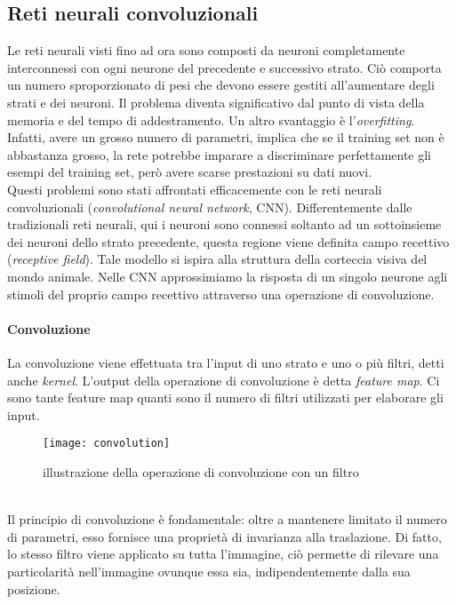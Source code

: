 \subsection{Reti neurali convoluzionali}
Le reti neurali visti fino ad ora sono composti da neuroni completamente interconnessi con ogni neurone del precedente e successivo strato. Ciò comporta un numero sproporzionato di pesi che devono essere gestiti all'aumentare degli strati e dei neuroni. Il problema diventa significativo dal punto di vista della memoria e del tempo di addestramento. Un altro svantaggio è l'\textit{overfitting}. Infatti, avere un grosso numero di parametri, implica che se il training set non è abbastanza grosso, la rete potrebbe imparare a discriminare perfettamente gli esempi del training set, però avere scarse prestazioni su dati nuovi.\\
Questi problemi sono stati affrontati efficacemente con le reti neurali convoluzionali (\textit{convolutional neural network}, CNN). Differentemente dalle tradizionali reti neurali, qui i neuroni sono connessi soltanto ad un sottoinsieme dei neuroni dello strato precedente, questa regione viene definita campo recettivo (\textit{receptive field}). Tale modello si ispira alla struttura della corteccia visiva del mondo animale. Nelle CNN approssimiamo la risposta di un singolo neurone agli stimoli del proprio campo recettivo attraverso una operazione di convoluzione.
\paragraph{Convoluzione} 
La convoluzione viene effettuata tra l'input di uno strato e uno o più filtri, detti anche \textit{kernel}. L'output della operazione di convoluzione è detta \textit{feature map}. Ci sono tante feature map quanti sono il numero di filtri utilizzati per elaborare gli input. 
\begin{figure}[ht]
    \centering
    \texttt{[image: convolution]}
    \caption[Esempio di convoluzione]{illustrazione della operazione di convoluzione con un filtro}
\end{figure}\\
Il principio di convoluzione è fondamentale: oltre a mantenere limitato il numero di parametri, esso fornisce una proprietà di invarianza alla traslazione. Di fatto, lo stesso filtro viene applicato su tutta l'immagine, ciò permette di rilevare una particolarità nell'immagine ovunque essa sia, indipendentemente dalla sua posizione. 
